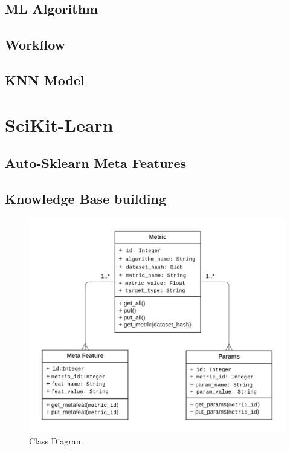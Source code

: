 \subsection{ML Algorithm}
\subsection{Workflow}

\subsection{KNN Model}
\label{knn-model}

\section{SciKit-Learn}
\label{scikit-learn}

\subsection{Auto-Sklearn Meta Features}
\label{auto-sklearn}

\subsection{Knowledge Base building}
\label{knowledge-base}


\begin{figure}[H]
    \centering
    \includegraphics[width=15cm]{images/Class Diagram.jpeg}
    \caption{Class Diagram}
    \label{class-diagram}
\end{figure}

